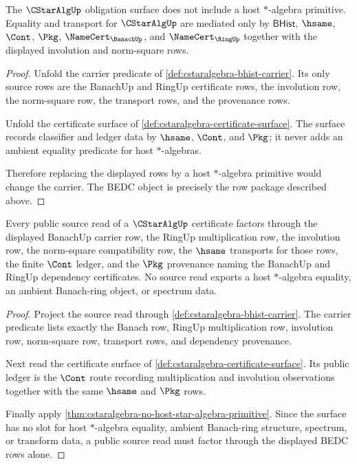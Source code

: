 \begin{theorem}
\label{thm:cstaralgebra-no-host-star-algebra-primitive}
The $\CStarAlgUp$ obligation surface does not include a host $*$-algebra primitive. Equality and transport for $\CStarAlgUp$ are mediated only by $\mathsf{BHist}$, $\hsame$, $\Cont$, $\Pkg$, $\NameCert_{\BanachUp}$, and $\NameCert_{\RingUp}$ together with the displayed involution and norm-square rows.
\end{theorem}
\begin{proof}
Unfold the carrier predicate of \autoref{def:cstaralgebra-bhist-carrier}. Its only source rows are the BanachUp and RingUp certificate rows, the involution row, the norm-square row, the transport rows, and the provenance rows.

Unfold the certificate surface of \autoref{def:cstaralgebra-certificate-surface}. The surface records classifier and ledger data by $\hsame$, $\Cont$, and $\Pkg$; it never adds an ambient equality predicate for host $*$-algebras.

Therefore replacing the displayed rows by a host $*$-algebra primitive would change the carrier. The BEDC object is precisely the row package described above.
\end{proof}

\begin{theorem}
\label{thm:cstaralgebra-banach-ring-source-boundary}
Every public source read of a $\CStarAlgUp$ certificate factors through the
displayed BanachUp carrier row, the RingUp multiplication row, the involution
row, the norm-square compatibility row, the $\hsame$ transports for those rows,
the finite $\Cont$ ledger, and the $\Pkg$ provenance naming the BanachUp and
RingUp dependency certificates. No source read exports a host $*$-algebra
equality, an ambient Banach-ring object, or spectrum data.
\end{theorem}
\begin{proof}
Project the source read through
\autoref{def:cstaralgebra-bhist-carrier}. The carrier predicate lists exactly
the Banach row, RingUp multiplication row, involution row, norm-square row,
transport rows, and dependency provenance.

Next read the certificate surface of
\autoref{def:cstaralgebra-certificate-surface}. Its public ledger is the
$\Cont$ route recording multiplication and involution observations together
with the same $\hsame$ and $\Pkg$ rows.

Finally apply
\autoref{thm:cstaralgebra-no-host-star-algebra-primitive}. Since the surface has
no slot for host $*$-algebra equality, ambient Banach-ring structure, spectrum,
or transform data, a public source read must factor through the displayed BEDC
rows alone.
\end{proof}

